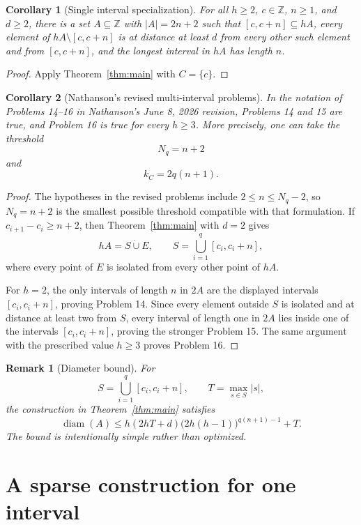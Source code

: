 \documentclass[11pt]{article}
\newtheorem{corollary}{Corollary}
\newtheorem{remark}{Remark}
\newcommand{\Z}{\mathbb{Z}}
\begin{document}
\begin{corollary}[Single interval specialization]\label{cor:single}
For all $h\geq 2$, $c\in\Z$, $n\geq 1$, and $d\geq 2$, there is a set
$A\subseteq\Z$ with $|A|=2n+2$ such that $[c,c+n]\subseteq hA$, every
element of $hA\setminus[c,c+n]$ is at distance at least $d$ from every
other such element and from $[c,c+n]$, and the longest interval in $hA$ has
length $n$.
\end{corollary}

\begin{proof}
Apply Theorem~\ref{thm:main} with $C=\{c\}$.
\end{proof}

\begin{corollary}[Nathanson's revised multi-interval problems]\label{cor:problems}
In the notation of Problems 14--16 in Nathanson's June 8, 2026 revision,
Problems 14 and 15 are true, and Problem 16 is true for every $h\geq 3$.
More precisely, one can take the threshold
\[
 N_q=n+2
\]
and
\[
 k_C=2q(n+1).
\]
\end{corollary}

\begin{proof}
The hypotheses in the revised problems include $2\leq n\leq N_q-2$, so
$N_q=n+2$ is the smallest possible threshold compatible with that
formulation. If $c_{i+1}-c_i\geq n+2$, then Theorem~\ref{thm:main} with
$d=2$ gives
\[
 hA=S\mathbin{\dot\cup}E,
 \qquad S=\bigcup_{i=1}^q[c_i,c_i+n],
\]
where every point of $E$ is isolated from every other point of $hA$.

For $h=2$, the only intervals of length $n$ in $2A$ are the displayed
intervals $[c_i,c_i+n]$, proving Problem 14. Since every element outside
$S$ is isolated and at distance at least two from $S$, every interval of
length one in $2A$ lies inside one of the intervals $[c_i,c_i+n]$, proving
the stronger Problem 15. The same argument with the prescribed value
$h\geq 3$ proves Problem 16.
\end{proof}

\begin{remark}[Diameter bound]
For
\[
 S=\bigcup_{i=1}^q[c_i,c_i+n],
 \qquad
 T=\max_{s\in S}|s|,
\]
the construction in Theorem~\ref{thm:main} satisfies
\[
 \operatorname{diam}(A)
 \leq h(2hT+d)\bigl(2h(h-1)\bigr)^{q(n+1)-1}+T.
\]
The bound is intentionally simple rather than optimized.
\end{remark}

\section{A sparse construction for one interval}
\end{document}
